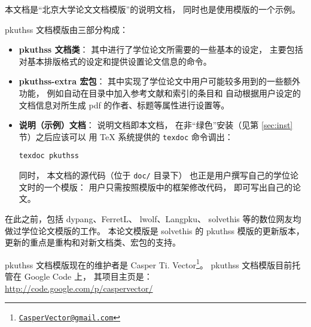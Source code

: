 

本文档是“北京大学论文文档模版”的说明文档，
同时也是使用模版的一个示例。

pkuthss 文档模版由三部分构成：
\begin{itemize}
	\item \textbf{pkuthss 文档类}：
		其中进行了学位论文所需要的一些基本的设定，
		主要包括对基本排版格式的设定和提供设置论文信息的命令。
	\item \textbf{pkuthss-extra 宏包}：
		其中实现了学位论文中用户可能较多用到的一些额外功能，
		例如自动在目录中加入参考文献和索引的条目和%
		自动根据用户设定的文档信息对所生成 pdf 的作者、标题等属性进行设置等。
	\item \textbf{说明（示例）文档}：
		说明文档即本文档，
		在非“绿色”安装（见第 \ref{sec:inst} 节）之后应该可以%
		用 \TeX{} 系统提供的 \verb|texdoc| 命令调出：
\begin{Verbatim}[frame=single]
texdoc pkuthss
\end{Verbatim}
		同时，
		本文档的源代码（位于 \verb|doc/| 目录下）%
		也正是用户撰写自己的学位论文时的一个模版：
		用户只需按照模版中的框架修改代码，
		即可写出自己的论文。
\end{itemize}

在此之前，包括 dypang\cite{dypang}、FerretL\cite{FerretL}、%
lwolf\cite{lwolf}、Langpku\cite{Langpku}、%
solvethis\cite{solvethis} 等的数位网友均做过学位论文模版的工作。
本论文模版是 solvethis 的 pkuthss 模版的更新版本，
更新的重点是重构和对新文档类、宏包的支持。

pkuthss 文档模版现在的维护者是 Casper Ti. Vector\footnote%
{\href{mailto:CasperVector@gmail.com}{\texttt{CasperVector@gmail.com}}}。%
pkuthss 文档模版目前托管在 Google Code 上，
其项目主页是：\\
\hspace*{\parindent}\url{http://code.google.com/p/caspervector/}

